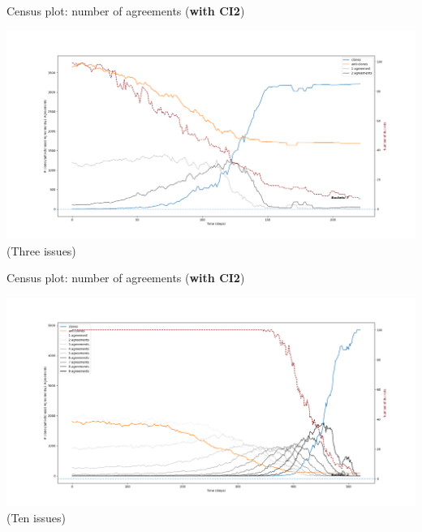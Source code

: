 \documentclass[12pt]{beamer}
\begin{document}
\begin{frame}[c]{Census plot: number of agreements (\textbf{with CI2})} %

\vspace{-.3in}
\begin{center}
\hspace{-.6in} \includegraphics[width=1.11\textwidth]{census3issuesCI2.png}
\vspace{-.3in}
\scriptsize (Three issues)
\end{center}

\end{frame}

\begin{frame}[c]{Census plot: number of agreements (\textbf{with CI2})} %

\vspace{-.3in}
\begin{center}
\hspace{-.6in} \includegraphics[width=1.11\textwidth]{census10issuesCI2.png}
\vspace{-.3in}
\scriptsize (Ten issues)
\end{center}

\end{frame}
\end{document}
